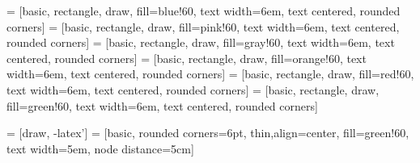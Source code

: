 \documentclass{article}
\begin{document}

 = [basic, rectangle, draw, fill=blue!60, 
    text width=6em, text centered, rounded corners]
 = [basic, rectangle, draw, fill=pink!60, 
    text width=6em, text centered, rounded corners]
 = [basic, rectangle, draw, fill=gray!60, 
    text width=6em, text centered, rounded corners]
 = [basic, rectangle, draw, fill=orange!60, 
    text width=6em, text centered, rounded corners]
 = [basic, rectangle, draw, fill=red!60, 
    text width=6em, text centered, rounded corners]
 = [basic, rectangle, draw, fill=green!60, 
    text width=6em, text centered, rounded corners]

 = [draw, -latex']
 = [basic, rounded corners=6pt, thin,align=center, fill=green!60, text width=5em, node distance=5cm] 
\end{document}
